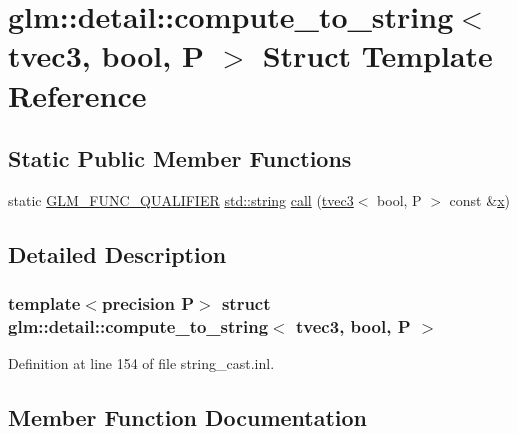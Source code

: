 \hypertarget{structglm_1_1detail_1_1compute__to__string_3_01tvec3_00_01bool_00_01_p_01_4}{}\section{glm\+::detail\+::compute\+\_\+to\+\_\+string$<$ tvec3, bool, P $>$ Struct Template Reference}
\label{structglm_1_1detail_1_1compute__to__string_3_01tvec3_00_01bool_00_01_p_01_4}
\subsection*{Static Public Member Functions}
\begin{DoxyCompactItemize}
\item 
static \mbox{\hyperlink{setup_8hpp_a33fdea6f91c5f834105f7415e2a64407}{G\+L\+M\+\_\+\+F\+U\+N\+C\+\_\+\+Q\+U\+A\+L\+I\+F\+I\+ER}} \mbox{\hyperlink{glad_8h_ac83513893df92266f79a515488701770}{std\+::string}} \mbox{\hyperlink{structglm_1_1detail_1_1compute__to__string_3_01tvec3_00_01bool_00_01_p_01_4_abd2a1017b5cd9b3bcb514189dd4814b9}{call}} (\mbox{\hyperlink{structglm_1_1tvec3}{tvec3}}$<$ bool, P $>$ const \&\mbox{\hyperlink{glad_8h_a92d0386e5c19fb81ea88c9f99644ab1d}{x}})
\end{DoxyCompactItemize}


\subsection{Detailed Description}
\subsubsection*{template$<$precision P$>$\newline
struct glm\+::detail\+::compute\+\_\+to\+\_\+string$<$ tvec3, bool, P $>$}



Definition at line 154 of file string\+\_\+cast.\+inl.



\subsection{Member Function Documentation}
\mbox{\label{structglm_1_1detail_1_1compute__to__string_3_01tvec3_00_01bool_00_01_p_01_4_abd2a1017b5cd9b3bcb514189dd4814b9}} 
